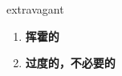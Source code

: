 
\begin{frame}
{\huge extravagant}
\begin{center}
\begin{enumerate}\Large
  \item \textbf{挥霍的}
  \item \textbf{过度的，不必要的}
\end{enumerate}
\end{center}
\end{frame}
